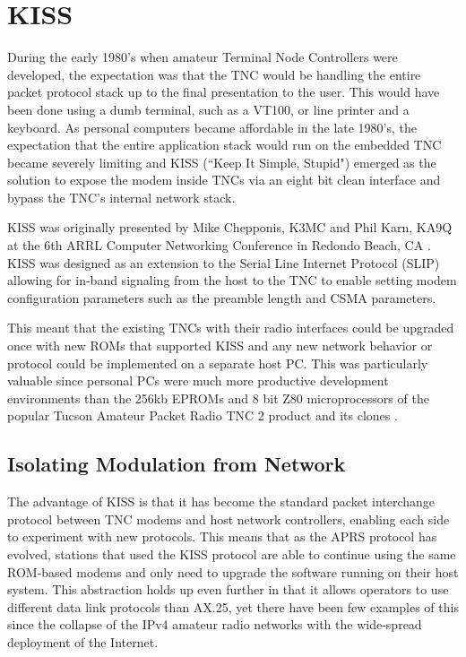 \chapter{KISS}

During the early 1980's when amateur Terminal Node Controllers were developed,
the expectation was that the TNC would be handling 
the entire packet protocol stack up to the final presentation to the user.
This would have been done using a dumb terminal, such as a VT100, or line printer 
and a keyboard. 
As personal computers became affordable in the late 1980's, the expectation that
the entire application stack would run on the embedded TNC became severely limiting
and KISS (``Keep It Simple, Stupid") emerged as the solution to 
expose the modem inside TNCs via 
an eight bit clean interface and bypass the TNC's internal network stack.

KISS was originally presented by 
Mike Chepponis, K3MC and Phil Karn, KA9Q at the 6th ARRL Computer Networking
Conference in Redondo Beach, CA \cite{KISSspec}.
KISS was designed as an extension to the Serial Line 
Internet Protocol (SLIP) allowing for in-band signaling from 
the host to the TNC to enable setting modem 
configuration parameters such as the preamble length and CSMA parameters.

This meant that the existing TNCs with their radio interfaces could
be upgraded once with new ROMs that supported KISS and any new network behavior
or protocol could be implemented on a separate host PC.
This was particularly valuable since personal PCs were much
more productive development environments than the 256kb EPROMs and 8 bit
Z80 microprocessors of the popular Tucson Amateur Packet Radio TNC 2 product
and its clones \cite{TNC2manual}.

\section{Isolating Modulation from Network}

The advantage of KISS is that it has become the standard packet interchange protocol
between TNC modems and host network controllers,
enabling each side to experiment with new protocols.
This means that as the APRS protocol has evolved, stations that used the
KISS protocol are able to continue using the same ROM-based modems and only
need to upgrade the software running on their host system.
This abstraction holds up even further in that it allows operators to
use different data link protocols than AX.25,
yet there have been few examples of this since the collapse of the IPv4 amateur
radio networks with the wide-spread deployment of the Internet.

